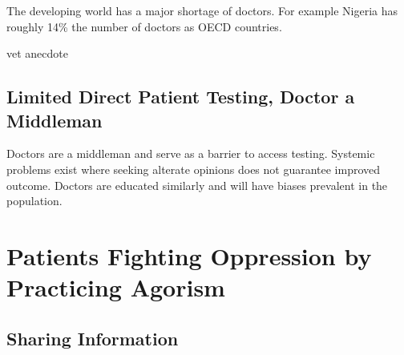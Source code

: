 \documentclass{article}
\begin{document}

The developing world has a major shortage of doctors. For example Nigeria has roughly 14\% the number of doctors as OECD countries. \cite{wef2014}


vet anecdote



\cite{ferguson2007patients}

\subsection{Limited Direct Patient Testing, Doctor a Middleman}

Doctors are a middleman and serve as a barrier to access testing. Systemic problems exist where seeking alterate opinions does not guarantee improved outcome. Doctors are educated similarly and will have biases prevalent in the population. 

\cite{CarsonDesktop}

\section{Patients Fighting Oppression by Practicing Agorism}

\subsection{Sharing Information}


\end{document}
